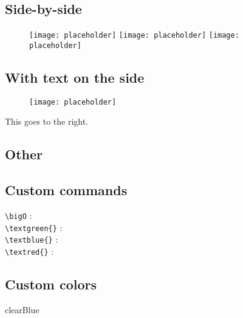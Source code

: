 \documentclass{customSynthesis}
\begin{document}
\subsection*{Side-by-side}

\begin{figure}[H]
    \centering
    \texttt{[image: placeholder]}\hfill
	\texttt{[image: placeholder]}\hfill
	\texttt{[image: placeholder]}
\end{figure}

\subsection*{With text on the side}

\begin{minipage}{0.5\textwidth}
	\begin{figure}[H]
		\centering
		\texttt{[image: placeholder]}
	\end{figure}
\end{minipage}
\begin{minipage}{0.5\textwidth}
	This goes to the right.
\end{minipage}

\subsection*{Other}

\subsection*{Custom commands}

\verb|\bigO| : \bigO\\
\verb|\textgreen{}| : \\
\verb|\textblue{}| : \\
\verb|\textred{}| : 

\subsection*{Custom colors}

\textcolor{clearBlue}{clearBlue}
\end{document}
